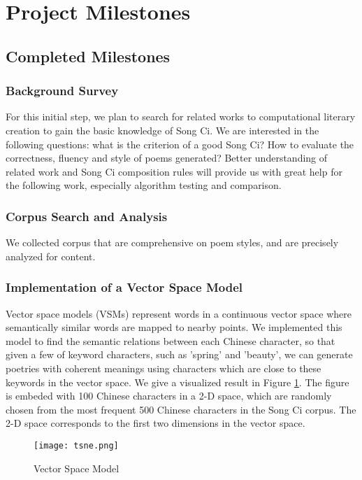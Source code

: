 \section{Project Milestones} 

\subsection{Completed Milestones} 
%
\subsubsection{Background Survey}
 For this initial step, we plan to search for related works to computational literary creation to gain the basic knowledge of Song Ci.
%
We are interested in the following questions: what is the criterion of a good Song Ci? How to evaluate the correctness, fluency and style of poems generated?
%
Better understanding of related work and Song Ci composition rules will provide us with great help for the following work, especially algorithm testing and comparison. 
%
\subsubsection {Corpus Search and Analysis}
%

We collected corpus that are comprehensive on poem styles, and are precisely analyzed for content. 

%
\subsubsection{ Implementation of a Vector Space Model }
Vector space models (VSMs) represent words in a continuous vector space where semantically similar words are mapped to nearby points.
%
We implemented this model to find the semantic relations between each Chinese character, so that given a few of keyword characters, such as 'spring' and 'beauty', we can generate poetries with coherent meanings using characters which are close to these keywords in the vector space.
%
%
We give a visualized result in Figure \ref{fig:VSM}. The figure is embeded with 100 Chinese characters in a 2-D space, which are randomly chosen from the most frequent 500 Chinese characters in the Song Ci corpus. The 2-D space corresponds to the first two dimensions in the vector space.
\begin{figure}[htbp]
	\centering
	\texttt{[image: tsne.png]}
	\caption{Vector Space Model}
	\label{fig:VSM}	
\end{figure} 


